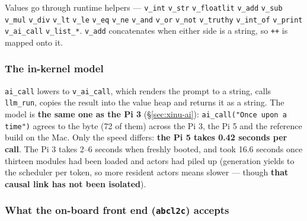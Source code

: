 \documentclass[11pt,a4paper]{article}
\begin{document}
Values go through runtime helpers --- \texttt{v\_int} \texttt{v\_str}
\texttt{v\_floatlit} \texttt{v\_add} \texttt{v\_sub} \texttt{v\_mul}
\texttt{v\_div} \texttt{v\_lt} \texttt{v\_le} \texttt{v\_eq} \texttt{v\_ne}
\texttt{v\_and} \texttt{v\_or} \texttt{v\_not} \texttt{v\_truthy}
\texttt{v\_int\_of} \texttt{v\_print} \texttt{v\_ai\_call} \texttt{v\_list\_*}.
\texttt{v\_add} concatenates when either side is a string, so \texttt{++} is
mapped onto it.

\subsubsection*{The in-kernel model}

\texttt{ai\_call} lowers to \texttt{v\_ai\_call}, which renders the prompt to a
string, calls \texttt{llm\_run}, copies the result into the value heap and
returns it as a string. The model is \textbf{the same one as the Pi 3}
(\S\ref{sec:xinu-ai}): \texttt{ai\_call("Once upon a time")} agrees to the byte
(72 of them) across the Pi 3, the Pi 5 and the reference build on the Mac.
Only the speed differs: \textbf{the Pi 5 takes 0.42 seconds per call}. The
Pi 3 takes 2--6 seconds when freshly booted, and took 16.6 seconds once
thirteen modules had been loaded and actors had piled up (generation yields to
the scheduler per token, so more resident actors means slower --- though
\textbf{that causal link has not been isolated}).

\subsubsection*{What the on-board front end (\texttt{abcl2c}) accepts}
\end{document}
